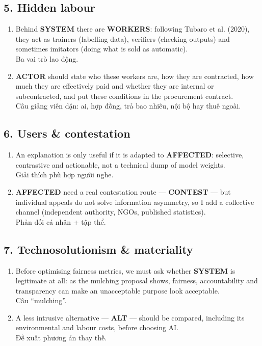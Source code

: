 \documentclass[11pt,a4paper]{article}
\newcommand{\vitext}[1]{{\small\color{tipc}#1}}
\newcommand{\slot}[1]{{\setlength{\fboxsep}{1.2pt}\colorbox{slotbg}{\sffamily\scriptsize\bfseries\color{RoyalBlue}#1}}}
\begin{document}
\subsection*{5. Hidden labour}\begin{enumerate}[leftmargin=1.6em]
\item Behind \slot{SYSTEM} there are \slot{WORKERS}: following Tubaro et al. (2020), they act as trainers (labelling data), verifiers (checking outputs) and sometimes imitators (doing what is sold as automatic).\\\vitext{Ba vai trò lao động.}
\item \slot{ACTOR} should state who these workers are, how they are contracted, how much they are effectively paid and whether they are internal or subcontracted, and put these conditions in the procurement contract.\\\vitext{Câu giảng viên dặn: ai, hợp đồng, trả bao nhiêu, nội bộ hay thuê ngoài.}
\end{enumerate}
\subsection*{6. Users \& contestation}\begin{enumerate}[leftmargin=1.6em]
\item An explanation is only useful if it is adapted to \slot{AFFECTED}: selective, contrastive and actionable, not a technical dump of model weights.\\\vitext{Giải thích phù hợp người nghe.}
\item \slot{AFFECTED} need a real contestation route — \slot{CONTEST} — but individual appeals do not solve information asymmetry, so I add a collective channel (independent authority, NGOs, published statistics).\\\vitext{Phản đối cá nhân + tập thể.}
\end{enumerate}
\subsection*{7. Technosolutionism \& materiality}\begin{enumerate}[leftmargin=1.6em]
\item Before optimising fairness metrics, we must ask whether \slot{SYSTEM} is legitimate at all: as the mulching proposal shows, fairness, accountability and transparency can make an unacceptable purpose look acceptable.\\\vitext{Câu “mulching”.}
\item A less intrusive alternative — \slot{ALT} — should be compared, including its environmental and labour costs, before choosing AI.\\\vitext{Đề xuất phương án thay thế.}
\end{enumerate}
\end{document}
